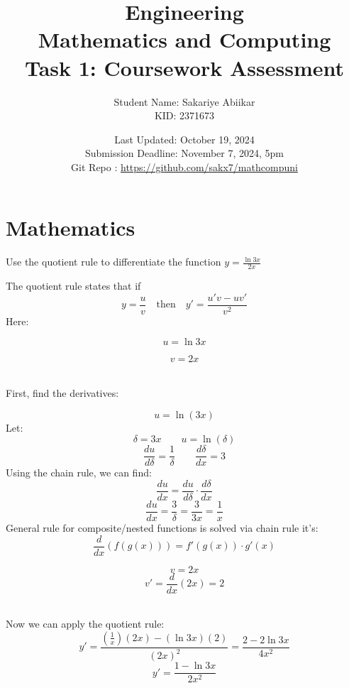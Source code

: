 \documentclass[a4paper, 12pt]{report}
\title{\vspace{3em} \Huge \textbf{Engineering\\ Mathematics and Computing}\\ \vspace{1em} \Large Task 1: Coursework Assessment}
\author{Student Name: Sakariye Abiikar\\ KID: 2371673}
\date{Last Updated: October 19, 2024\\ Submission Deadline: November 7, 2024, 5pm \\[1em] Git Repo : \color{blue}\url{https://github.com/sakx7/mathcompuni}}
\begin{document}
    
    \maketitle
    \thispagestyle{empty}
    
    \newpage
    \thispagestyle{empty}

    \chapter{Mathematics}
    
    \newpage\centering\restoregeometry
    
    \setcounter{page}{1}

    \begin{tcolorbox}[title={\color{black}{\section{Q1}}}, colback=white, colframe=black!30!white, boxrule=0.4mm, width=1\textwidth]
        Use the quotient rule to differentiate the function \( y=\frac{\ln 3 x}{2 x} \)
    \end{tcolorbox}
    
    The quotient rule states that if
    \[y = \frac{u}{v} \quad \text{then} \quad y' = \frac{u'v - uv'}{v^2}\]
    Here: \\[5pt]
    \begin{minipage}{0.4\textwidth}
        \[u = \ln 3x\] 
    \end{minipage}\hspace{-8em}
    \begin{minipage}{0.4\textwidth}
        \[v = 2x \]
    \end{minipage}\\[20pt]
    First, find the derivatives:\\[10pt]
    \begin{minipage}{0.43\textwidth}\centering
    \[u = \ln(3x)\]
    Let:
    \[\delta = 3x \qquad u = \ln(\delta)\]
    \[\frac{du}{d\delta} = \frac{1}{\delta} \qquad \frac{d\delta}{dx} = 3\]
    Using the chain rule, we can find:
    \[\frac{du}{dx} = \frac{du}{d\delta} \cdot \frac{d\delta}{dx}\]
    \[\frac{du}{dx} = \frac{3}{\delta} = \frac{3}{3x}= \frac{1}{x}\]
    General rule for composite/nested functions is solved via chain rule it's:
    \[\frac{d}{dx}(f(g(x))) = f'(g(x))\cdot g'(x)\]
    \end{minipage}\hspace{1em}\vrule\hspace{-2.5em}
    \begin{minipage}{0.4\textwidth}
        \[v = 2x\]
        \[v' = \frac{d}{dx}(2x) = 2\]
    \end{minipage}\\[30pt]
    Now we can apply the quotient rule:
    \[y' = \frac{\left(\frac{1}{x}\right)(2x) - (\ln 3x)(2)}{(2x)^2} = \frac{2 - 2\ln 3x}{4x^2}\]
    \[\boxed{y' = \frac{1 - \ln 3x}{2x^2}}\]
    
\end{document}
